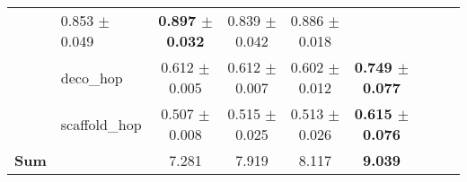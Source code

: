 \begin{tabular}{llccccccc}
    & 0.853 \footnotesize{$\pm$ 0.049} 
    & \textbf{0.897 \footnotesize{$\pm$ 0.032}} 
    & 0.839 \footnotesize{$\pm$ 0.042} 
    & 0.886 \footnotesize{$\pm$ 0.018} \\
     & deco\_hop 
    & 0.612 \footnotesize{$\pm$ 0.005} 
    & 0.612 \footnotesize{$\pm$ 0.007} 
    & 0.602 \footnotesize{$\pm$ 0.012} 
    & \textbf{0.749 \footnotesize{$\pm$ 0.077}} \\
     & scaffold\_hop 
    & 0.507 \footnotesize{$\pm$ 0.008} 
    & 0.515 \footnotesize{$\pm$ 0.025}
    & 0.513 \footnotesize{$\pm$ 0.026} 
    & \textbf{0.615 \footnotesize{$\pm$ 0.076}} \\
     \midrule
     \textbf{Sum} & & 7.281 & 7.919 & 8.117 & \textbf{9.039} \\
\bottomrule
\end{tabular}